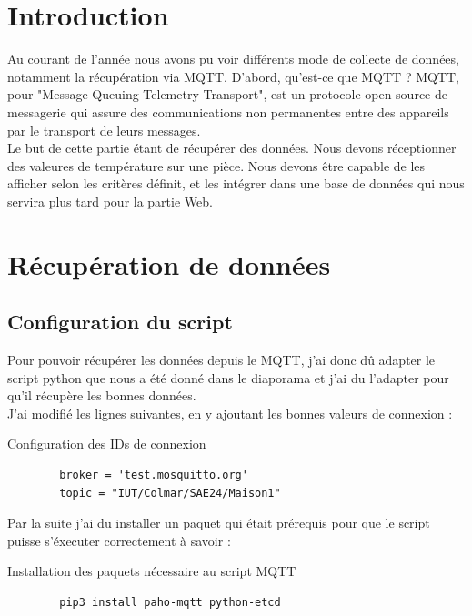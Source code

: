 \documentclass[12pt, a4paper]{article}
\begin{document}
\newpage

\section{Introduction}
Au courant de l'année nous avons pu voir différents mode de collecte de
données, notamment la récupération via MQTT. D'abord, qu'est-ce que MQTT ?
MQTT, pour "Message Queuing Telemetry Transport", est un protocole
open source de messagerie qui assure des communications non permanentes
entre des appareils par le transport de leurs messages.\\
Le but de cette partie étant de récupérer des données. Nous devons réceptionner
des valeures de température sur une pièce. Nous devons être capable de
les afficher selon les critères définit, et les intégrer dans une base de
données qui nous servira plus tard pour la partie Web. 
	\section{Récupération de données}
		\subsection{Configuration du script}
		Pour pouvoir récupérer les données depuis le MQTT, j'ai donc dû
		adapter le script python que nous a été donné dans le diaporama
		et j'ai du l'adapter pour qu'il récupère les bonnes données.\\ 
		J'ai modifié les lignes suivantes, en y ajoutant les bonnes valeurs
		de connexion :
		\begin{listing}[H]
			\caption{Configuration des IDs de connexion}
			\label{lst:id}
			\begin{verbatim}
		broker = 'test.mosquitto.org'
		topic = "IUT/Colmar/SAE24/Maison1"
			\end{verbatim}
		\end{listing}
		Par la suite j'ai du installer un paquet qui était prérequis 
		pour que le script puisse s'éxecuter correctement à savoir :
		\begin{listing}[H]
			\caption{Installation des paquets nécessaire au script MQTT}
			\label{lst:paho}
			\begin{verbatim}
		pip3 install paho-mqtt python-etcd
			\end{verbatim}
		\end{listing}
		\newpage
\end{document}
